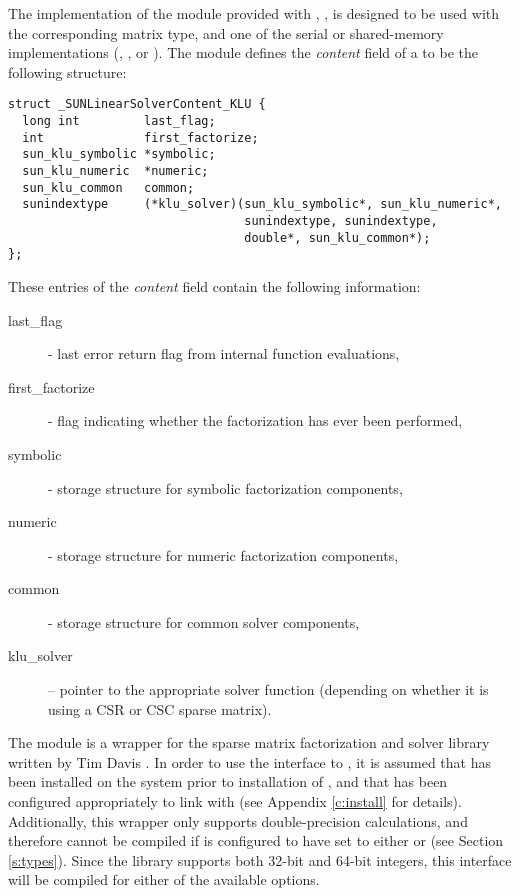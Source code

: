 
The {\klu} implementation of the {\sunlinsol} module provided with
{\sundials}, {\sunlinsolklu}, is designed to be used with the
corresponding {\sunmatsparse} matrix type, and one of the serial or
shared-memory {\nvector} implementations ({\nvecs}, {\nvecopenmp}, or 
{\nvecpthreads}).  The {\sunlinsolklu} module defines the {\em
content} field of a  to be the following structure:
\begin{verbatim} 
struct _SUNLinearSolverContent_KLU {
  long int         last_flag;
  int              first_factorize;
  sun_klu_symbolic *symbolic;
  sun_klu_numeric  *numeric;
  sun_klu_common   common;
  sunindextype     (*klu_solver)(sun_klu_symbolic*, sun_klu_numeric*,
                                 sunindextype, sunindextype,
                                 double*, sun_klu_common*);
};
\end{verbatim}
These entries of the \emph{content} field contain the following
information:
\begin{description}
  \item[last\_flag] - last error return flag from internal function evaluations,
  \item[first\_factorize] - flag indicating whether the factorization
    has ever been performed, 
  \item[symbolic] - {\klu} storage structure for symbolic factorization components,
  \item[numeric] - {\klu} storage structure for numeric factorization components,
  \item[common] - storage structure for common {\klu} solver components,
  \item[klu\_solver] -- pointer to the appropriate {\klu} solver function
    (depending on whether it is using a CSR or CSC sparse matrix).
\end{description}

{\warn} The {\sunlinsolklu} module is a {\sunlinsol} wrapper for
the {\klu} sparse matrix factorization and solver library written by Tim
Davis \cite{KLU_site,DaPa:10}.  In order to use the
{\sunlinsolklu} interface to {\klu}, it is assumed that {\klu} has
been installed on the system prior to installation of {\sundials}, and
that {\sundials} has been configured appropriately to link with {\klu}
(see Appendix \ref{c:install} for details).  Additionally, this
wrapper only supports double-precision calculations, and therefore
cannot be compiled if {\sundials} is configured to have 
set to either  or  (see Section \ref{s:types}).
Since the {\klu} library supports both 32-bit and 64-bit integers, this
interface will be compiled for either of the available  options.

